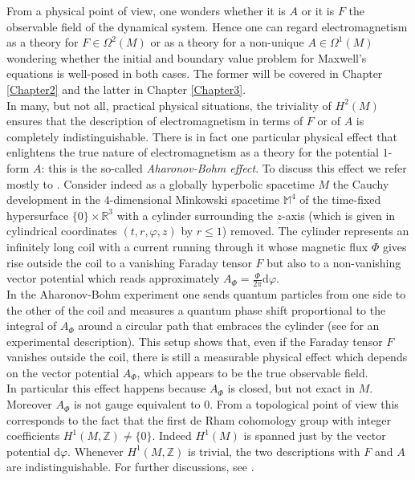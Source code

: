 From a physical point of view, one wonders whether it is $A$ or it is $F$ the observable field of the dynamical system. Hence one can regard electromagnetism as a theory for $F\in\Omega^2(M)$ or as a theory for a non-unique $A\in\Omega^1(M)$ wondering whether the initial and boundary value problem for Maxwell's equations is well-posed in both cases. The former will be covered in Chapter \ref{Chapter2} and the latter in Chapter \ref{Chapter3}.\\
In many, but not all, practical physical situations, the triviality of $H^2(M)$ ensures that the description of electromagnetism in terms of $F$ or of $A$ is completely indistinguishable. There is in fact one particular physical effect that enlightens the true nature of electromagnetism as a theory for the potential $1$-form $A$: this is the so-called \emph{Aharonov-Bohm effect}. To discuss this effect we refer mostly to \cite[Ex. 3.1]{Dappiaggi-Hack-Sanders-14}. Consider indeed as a globally hyperbolic spacetime $M$ the Cauchy development in the $4$-dimensional Minkowski spacetime $\mathbb{M}^4$ of the time-fixed hypersurface $\{0\}\times\mathbb{R}^3$ with a cylinder surrounding the $z$-axis (which is given in cylindrical coordinates $(t,r,\varphi,z)$ by $r\leq 1$) removed. The cylinder represents an infinitely long coil with a current running through it whose magnetic flux $\Phi$ gives rise outside the coil to a vanishing Faraday tensor $F$ but also to a non-vanishing vector potential which reads approximately $A_\Phi=\frac\Phi{2\pi}\mathrm{d}\varphi$.\\
In the Aharonov-Bohm experiment one sends quantum particles from one side to the other of the coil and measures a quantum phase shift proportional to the integral of $A_\Phi$ around a circular path that embraces the cylinder (see \cite{Peshkin-Tonomura-89} for an experimental description). This setup shows that, even if the Faraday tensor $F$ vanishes outside the coil, there is still a measurable physical effect which depends on the vector potential $A_\Phi$, which appears to be the true observable field.\\
In particular this effect happens because $A_\Phi$ is closed, but not exact in $M$. Moreover $A_\Phi$ is not gauge equivalent to $0$. From a topological point of view this corresponds to the fact that the first de Rham cohomology group with integer coefficients $H^1(M,\mathbb{Z})\neq\{0\}$. Indeed $H^1(M)$ is spanned just by the vector potential $\mathrm{d}\varphi$. Whenever $H^1(M,\mathbb{Z})$ is trivial, the two descriptions with $F$ and $A$ are indistinguishable. For further discussions, see \cite{Benini-Dappiaggi-Hack-Schenkel-14}.\\

